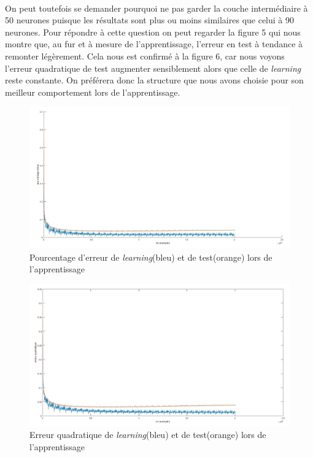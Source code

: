 \documentclass[a4paper,oneside]{report}
\begin{document}
\newpage
\paragraph{}
On peut toutefois se demander pourquoi ne pas garder la couche intermédiaire à 50 neurones puisque les résultats sont plus ou moins similaires que celui à 90 neurones. Pour répondre à cette question on peut regarder la figure 5 qui nous montre que, au fur et à mesure de l'apprentissage, l'erreur en test à tendance à remonter légèrement. Cela nous est confirmé à la figure 6, car nous voyons l'erreur quadratique de test augmenter sensiblement alors que celle de \textit{learning} reste constante. On préférera donc la structure que nous avons choisie pour son meilleur comportement lors de l'apprentissage.
\begin{figure}[!ht]
	\begin{center}
		\includegraphics[scale=0.27]{Images/courbes3couches50.jpg} 
		\caption{Pourcentage d'erreur de \textit{learning}(bleu) et de test(orange) lors de l'apprentissage} 
	\end{center}
\end{figure}
\begin{figure}[!h]
	\begin{center}
		\includegraphics[scale=0.27]{Images/courbes3couches50_quaderror.jpg} 
		\caption{Erreur quadratique de \textit{learning}(bleu) et de test(orange) lors de l'apprentissage}  
	\end{center}
\end{figure}
\end{document}
